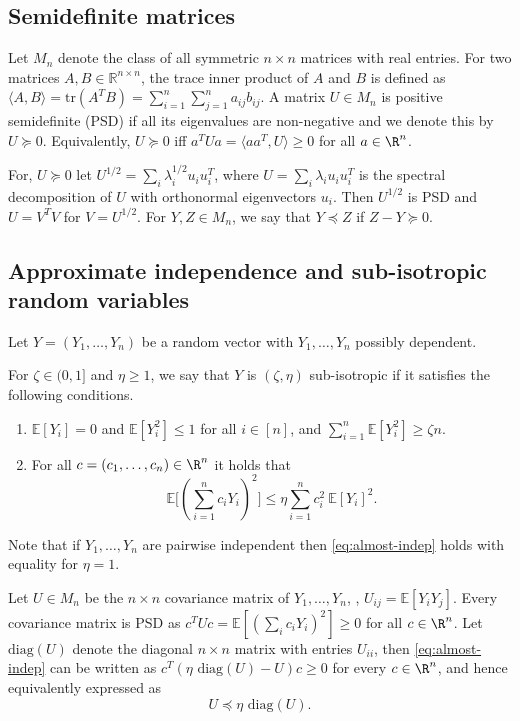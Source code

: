 \documentclass{toc}
\newcommand{\E}{\mathbb{E}}
\begin{document}
%
%
%
%
%
%
%
%
%

\subsection{Semidefinite matrices}
\label{s:psd}
Let $M_n$ denote the class of all symmetric  $n\times n$ matrices with real entries.
For two matrices $A,B \in \mathbb{R}^{n \times n}$,
the trace inner product of $A$ and $B$ is defined as
$\langle A, B\rangle = \textrm{tr}(A^TB) = \sum_{i=1}^n \sum_{j=1}^n a_{ij}b_{ij}.$
A matrix $U \in M_n$ is positive semidefinite (PSD) if all its eigenvalues are non-negative and we denote this by $U \succeq 0$.
Equivalently, $U \succeq 0$ iff   $a^TUa = \langle aa^T, U \rangle \geq 0$ for all $a \in \R^n$.

For, $U \succeq 0$ let $U^{1/2} = \sum_i \lambda_i^{1/2} u_iu_i^T$, where $
U = \sum_i \lambda_i u_iu_i^T$ is the spectral decomposition of $U$ with orthonormal eigenvectors $u_i$. Then $U^{1/2}$ is PSD and $U = V^T V$ for $V= U^{1/2}$.
%
For $Y,Z \in M_n$, we say that $Y \preceq Z$ if $Z-Y  \succeq 0$.

\subsection{Approximate independence and  sub-isotropic random variables}
Let $Y=(Y_1,\ldots,Y_n)$ be a random vector with $Y_1,\ldots,Y_n$ possibly dependent.
\begin{definition} For $ \zeta \in (0,1]$ and $ \eta \geq 1$, we say that $Y$ is $(\zeta,\eta)$ sub-isotropic if it satisfies the following conditions.
\begin{enumerate}
\item $\E[Y_i]=0$ and $\E[Y_i^2 ] \leq 1$ for all $i \in [n]$, and $\sum_{i=1}^n  \E[Y_i^2] \geq \zeta n$.
\item For all $c = (c_1,\ldots,c_n) \in \R^n$ it holds that
\begin{equation}
\label{eq:almost-indep}
     \E \Big[( \sum_{i=1}^n c_i Y_i)^2   \Big] \leq \eta \sum_{i=1}^n c_i^2 \ \E[Y_i]^2.
\end{equation}
\end{enumerate}
\end{definition}
Note that if $Y_1,\ldots,Y_n$ are pairwise independent then \eqref{eq:almost-indep} holds with equality for $\eta =1$.

Let $U \in M_n$ be the $n\times n$ covariance matrix of $Y_1,\ldots,Y_n$, \ie,
$U_{ij} = \E[Y_i Y_j]$. Every covariance matrix is PSD as
$ c^T U c =\E[ (\sum_i c_i Y_i)^2 ] \geq 0$ for all $c \in \R^n$.
Let $\text{diag}(U)$ denote the diagonal $n\times n$ matrix with entries $U_{ii}$, then
\eqref{eq:almost-indep} can be written as $c^T (\eta \text{ diag}(U) - U ) c \geq 0$ for every $c \in \R^n$, and hence
equivalently expressed as
\[  U \preceq \eta  \text{ diag}(U).\]
\end{document}
